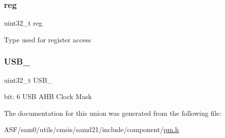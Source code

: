 \subsubsection{\texorpdfstring{reg}{reg}}
{\footnotesize\ttfamily uint32\+\_\+t reg}

Type used for register access \mbox{\label{union_p_m___a_h_b_m_a_s_k___type_ae77ce6f59c35c88ea05ef92a25090acc}} 
\subsubsection{\texorpdfstring{USB\_}{USB\_}}
{\footnotesize\ttfamily uint32\+\_\+t U\+S\+B\+\_\+}

bit\+: 6 U\+SB A\+HB Clock Mask 

The documentation for this union was generated from the following file\+:\begin{DoxyCompactItemize}
\item 
A\+S\+F/sam0/utils/cmsis/samd21/include/component/\mbox{\hyperlink{component_2pm_8h}{pm.\+h}}\end{DoxyCompactItemize}
